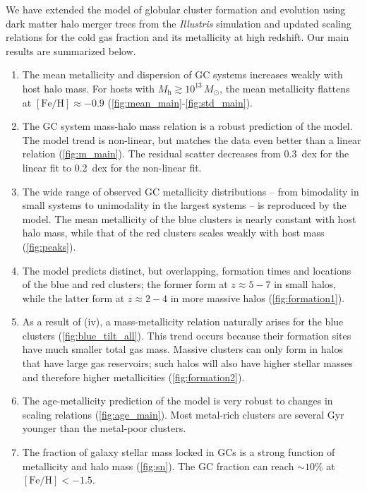 \documentclass[fleqn,usenatbib]{mnras}
\newcommand{\Mh}{M_{\mathrm{h}}}
\newcommand{\Msun}{\,M_{\odot}}
\newcommand{\feh}{\mathrm{[Fe/H]}}
\begin{document}
We have extended the model of globular cluster formation and evolution using dark matter halo merger trees from the \textit{Illustris} simulation and updated scaling relations for the cold gas fraction and its metallicity at high redshift. Our main results are summarized below.
\begin{enumerate}
\item The mean metallicity and dispersion of GC systems increases weakly with host halo mass. For hosts with $\Mh \gtrsim 10^{13}\Msun$, the mean metallicity flattens at $\feh\approx -0.9$ (\autoref{fig:mean_main}-\ref{fig:std_main}).

\item The GC system mass-halo mass relation is a robust prediction of the model. The model trend is non-linear, but matches the data even better than a linear relation (\autoref{fig:m_main}). The residual scatter decreases from 0.3~dex for the linear fit to 0.2~dex for the non-linear fit.

\item The wide range of observed GC metallicity distributions -- from bimodality in small systems to unimodality in the largest systems -- is reproduced by the model. The mean metallicity of the blue clusters is nearly constant with host halo mass, while that of the red clusters scales weakly with host mass (\autoref{fig:peaks}).

\item The model predicts distinct, but overlapping, formation times and locations of the blue and red clusters; the former form at $z\approx 5-7$ in small halos, while the latter form at $z\approx 2-4$ in more massive halos (\autoref{fig:formation1}).

\item As a result of (iv), a mass-metallicity relation naturally arises for the blue clusters (\autoref{fig:blue_tilt_all}). This trend occurs because their formation sites have much smaller total gas mass. Massive clusters can only form in halos that have large gas reservoirs; such halos will also have higher stellar masses and therefore higher metallicities (\autoref{fig:formation2}). 

\item The age-metallicity prediction of the model is very robust to changes in scaling relations (\autoref{fig:age_main}). Most metal-rich clusters are several Gyr younger than the metal-poor clusters.

\item The fraction of galaxy stellar mass locked in GCs is a strong function of metallicity and halo mass (\autoref{fig:sn}). The GC fraction can reach $\sim 10\%$ at $\feh < -1.5$.
\end{enumerate}
\end{document}
